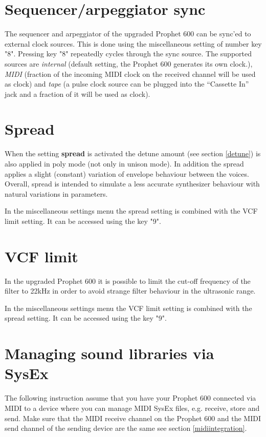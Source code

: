 \documentclass[draft,landscape, 11pt, oneside]{report}
\newenvironment{flowtext}{\addmargin[0cm]{7cm}}{\endaddmargin} %
\begin{document}
\begin{flowtext}
\section{Sequencer/arpeggiator sync}\label{sync}

The sequencer and arpeggiator of the upgraded Prophet 600 can be sync'ed to external clock sources. This is done using the miscellaneous setting of number key "8". Pressing key "8" repeatedly cycles through the sync source. The supported sources are \textit{internal} (default setting, the Prophet 600 generates its own clock.), \textit{MIDI} (fraction of the incoming MIDI clock on the received channel will be used as clock) and \textit{tape} (a pulse clock source can be plugged into the “Cassette In” jack and a fraction of it will be used as clock).

\section{Spread}\label{spreadsett}

When the setting \textbf{spread} is activated the detune amount (see section \ref{detune}) is also applied in poly mode (not only in unison mode). In addition the spread applies a slight (constant) variation of envelope behaviour between the voices. Overall, spread is intended to simulate a less accurate synthesizer behaviour with natural variations in parameters. 

In the miscellaneous settings menu the spread setting is combined with the VCF limit setting. It can be accessed using the key "9".

\section{VCF limit}\label{limitsett}

In the upgraded Prophet 600 it is possible to limit the cut-off frequency of the filter to 22kHz in order to avoid strange filter behaviour in the ultrasonic range.

In the miscellaneous settings menu the VCF limit setting is combined with the spread setting. It can be accessed using the key "9".  

\section{Managing sound libraries via SysEx}\label{mididump}

The following instruction assume that you have your Prophet 600 connected via MIDI to a device where you can manage MIDI SysEx files, e.g. receive, store and send. Make sure that the MIDI receive channel on the Prophet 600 and the MIDI send channel of the sending device are the same see section \ref{midiintegration}.


\end{flowtext}
\end{document}
